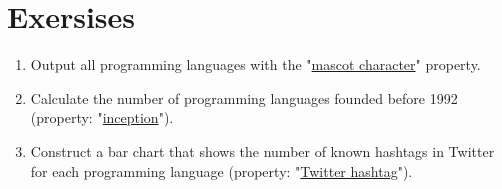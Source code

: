 \section{Exersises}
\begin{enumerate}
\item Output all programming languages with the "\href{https://www.wikidata.org/wiki/Property:P822}{mascot character}" property.
\item Calculate the number of programming languages founded before 1992 (property: "\href{https://www.wikidata.org/wiki/Property:P571}{inception}").
\item Construct a bar chart that shows the number of known hashtags in Twitter for each programming language (property: "\href{https://www.wikidata.org/wiki/Property:P2572}{Twitter hashtag}").
\end{enumerate}